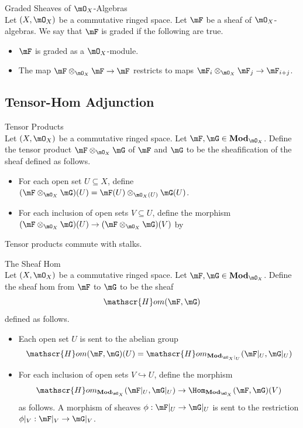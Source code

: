\documentclass[a4paper]{article}
\begin{document}
\begin{defn}{Graded Sheaves of $\mO_X$-Algebras}{}\\
Let $(X,\mO_X)$ be a commutative ringed space. Let $\mF$ be a sheaf of $\mO_X$-algebras. We say that $\mF$ is graded if the following are true. 
\begin{itemize}
\item $\mF$ is graded as a $\mO_X$-module. 
\item The map $\mF\otimes_{\mO_X}\mF\to\mF$ restricts to maps $\mF_i\otimes_{\mO_X}\mF_j\to\mF_{i+j}$. 
\end{itemize}
\end{defn}

\subsection{Tensor-Hom Adjunction}
\begin{defn}{Tensor Products}{}\\
Let $(X,\mO_X)$ be a commutative ringed space. Let $\mF,\mG\in\bold{Mod}_{\mO_X}$. Define the tensor product $\mF\otimes_{\mO_X}\mG$ of $\mF$ and $\mG$ to be the sheafification of the sheaf defined as follows. 
\begin{itemize}
\item For each open set $U\subseteq X$, define $(\mF\otimes_{\mO_X}\mG)(U)=\mF(U)\otimes_{\mO_X(U)}\mG(U)$. 
\item For each inclusion of open sets $V\subseteq U$, define the morphism $(\mF\otimes_{\mO_X}\mG)(U)\to(\mF\otimes_{\mO_X}\mG)(V)$ by 
\end{itemize}
\end{defn}

Tensor products commute with stalks. 

\begin{defn}{The Sheaf Hom}{}\\
Let $(X,\mO_X)$ be a commutative ringed space. Let $\mF,\mG\in\bold{Mod}_{\mO_X}$. Define the sheaf hom from $\mF$ to $\mG$ to be the sheaf $$\mathscr{H}om(\mF,\mG)$$ defined as follows. 
\begin{itemize}
\item Each open set $U$ is sent to the abelian group $$\mathscr{H}om(\mF,\mG)(U)=\mathscr{H}om_{\bold{Mod}_{\mO_X|_U}}(\mF|_U,\mG|_U)$$
\item For each inclusion of open sets $V\hookrightarrow U$, define the morphism $$\mathscr{H}om_{\bold{Mod}_{\mO_X}}(\mF|_U,\mG|_U)\to\Hom_{\bold{Mod}_{\mO_X}}(\mF,\mG)(V)$$ as follows. A morphism of sheaves $\phi:\mF|_U\to\mG|_U$ is sent to the restriction $\phi|_V:\mF|_V\to\mG|_V$. 
\end{itemize}
\end{defn}
\end{document}
